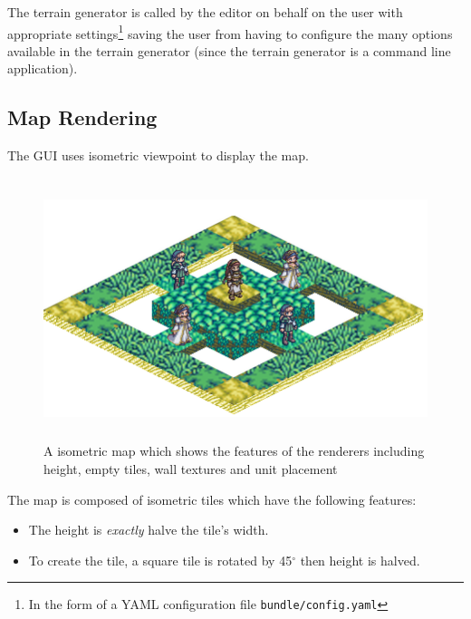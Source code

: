 The terrain generator is called by the editor on behalf on the user with appropriate settings\footnote{In the form of a YAML configuration file \texttt{bundle/config.yaml}} saving the user from having to configure the many options available in the terrain generator (since the terrain generator is a command line application).


\subsection{Map Rendering}
\label{ssub:map_rendering}

The GUI uses isometric viewpoint to display the map. 

\begin{figure}[htbp]
	\centering
		\includegraphics[height=3in]{figures/imp-map.png}
	\caption{A isometric map which shows the features of the renderers including height, empty tiles, wall textures and unit placement}
	\label{fig:figures_imp-map}
\end{figure}

The map is composed of isometric tiles which have the following features:

\begin{itemize}[topsep=0mm,noitemsep ]
	\item  The height is \emph{exactly} halve the tile's width.
	\item  To create the tile, a square tile is rotated by 45$^{\circ}$ then height is halved.
\end{itemize}


